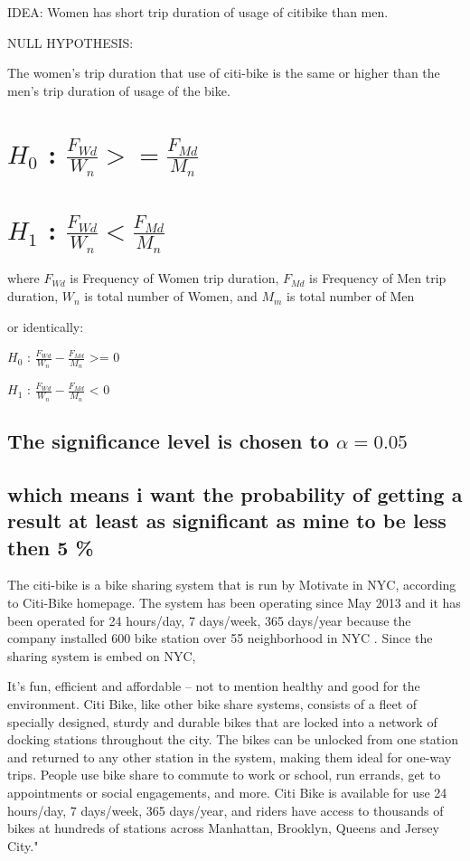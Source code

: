 IDEA:
Women has short trip duration of usage of citibike than men.

NULL HYPOTHESIS:

The women's trip duration that use of citi-bike is the same or higher than the men's trip duration of usage of the bike.

\section{$H_0$ : $\frac{F_{Wd}}{W_{n}} >= \frac{F_{Md}}{M_{n}} $ }



\section{$H_1$ : $\frac{F_{Wd}}{W_{n}} < \frac{F_{Md}}{M_{n}} $}

where $F_{Wd}$ is Frequency of Women trip duration, $F_{Md}$ is Frequency of Men trip duration, ${W_{n}}$ is total number of Women, and ${M_{m}}$ is total number of Men

or identically:

$H_0$ : $\frac{F_{Wd}}{W_{n}} - \frac{F_{Md}}{M_{n}} $ >= 0

$H_1$ : $\frac{F_{Wd}}{W_{n}} - \frac{F_{Md}}{M_{n}} $ < 0

\subsection{The significance level is chosen to $\alpha=0.05$}

\subsection{which means i want the probability of getting a result at least as significant as mine to be less then 5 \%}


The citi-bike is a bike sharing system that is run by Motivate in NYC, according to Citi-Bike homepage\cite{nyc}. The system has been operating since May 2013 and it has been operated for 24 hours/day, 7 days/week, 365 days/year because the company installed 600 bike station over 55 neighborhood in NYC \cite{nyc}. Since the sharing system is  embed on NYC,  

It's fun, efficient and affordable – not to mention healthy and good for the environment.
Citi Bike, like other bike share systems, consists of a fleet of specially designed, sturdy and durable bikes that are locked into a network of docking stations throughout the city. The bikes can be unlocked from one station and returned to any other station in the system, making them ideal for one-way trips. People use bike share to commute to work or school, run errands, get to appointments or social engagements, and more.
Citi Bike is available for use 24 hours/day, 7 days/week, 365 days/year, and riders have access to thousands of bikes at hundreds of stations across Manhattan, Brooklyn, Queens and Jersey City." 